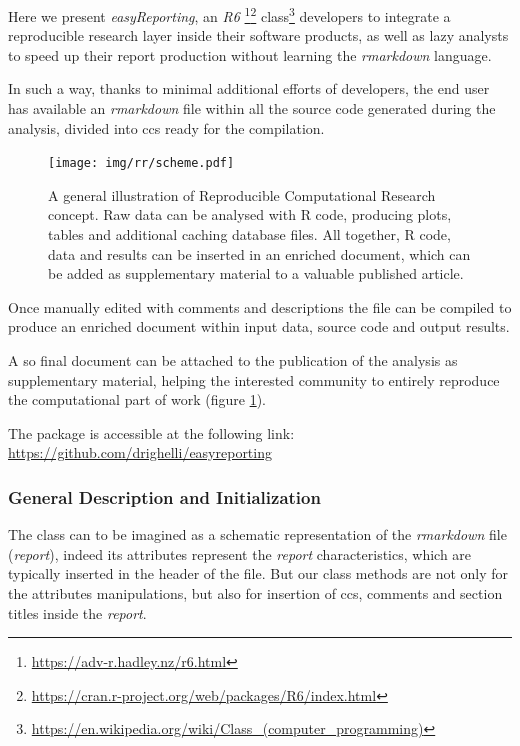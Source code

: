 Here we present \textit{easyReporting}, an \textit{R6} \footnote{\url{https://adv-r.hadley.nz/r6.html}}\footnote{\url{https://cran.r-project.org/web/packages/R6/index.html}} class\footnote{\url{https://en.wikipedia.org/wiki/Class_(computer_programming)}} developers to integrate a reproducible research layer inside their software products, as well as lazy analysts to speed up their report production without learning the \textit{rmarkdown} language.

In such a way, thanks to minimal additional efforts of developers, the end user has available an \textit{rmarkdown} file within all the source code generated during the analysis, divided into \glspl{cc} ready for the compilation.

\begin{figure}[H]
\centering
\texttt{[image: img/rr/scheme.pdf]}
\caption[Reproducible Computational Research illustration]{A general illustration of Reproducible Computational Research concept. Raw data can be analysed with R code, producing plots, tables and additional caching database files. All together, R code, data and results can be inserted in an enriched document, which can be added as supplementary material to a valuable published article.}
\label{fig:rrscheme}
\end{figure}

Once manually edited with comments and descriptions the file can be compiled to produce an enriched document within input data, source code and output results.

A so final document can be attached to the publication of the analysis as supplementary material, helping the interested community to entirely reproduce the computational part of work (figure \ref{fig:rrscheme}). 

The package is accessible at the following link:\\ \href{https://github.com/drighelli/easyreporting}{https://github.com/drighelli/easyreporting} 

\subsubsection{General Description and Initialization}

The class can to be imagined as a schematic representation of the \textit{rmarkdown} file (\textit{report}), indeed 
its attributes represent the \textit{report} characteristics, which are typically inserted in the header of the file.
But our class methods are not only for the attributes manipulations, but also for insertion of \glspl{cc}, comments and section titles inside the \textit{report}.

